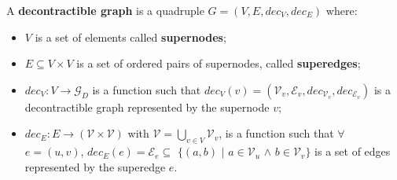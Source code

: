 \begin{minipage}[t]{\textwidth}
    {\tiny
    \begin{definizione}
    A \textbf{decontractible graph} is a quadruple $G = (V, E, dec_V, dec_E)$ where:
    \begin{itemize}
        \item $V$ is a set of elements called \textbf{supernodes};
        \item $E \subseteq V \times V$ is a set of ordered pairs of supernodes, called \textbf{superedges};
        \item $dec_V : V \rightarrow \mathcal{G}_D$ is a function such that $dec_V(v) = (\mathcal{V}_v,
            \mathcal{E}_v, dec_{\mathcal{V}_v}, dec_{\mathcal{E}_v})$ is a decontractible graph represented
            by the supernode $v$;
        \item $dec_E : E \rightarrow (\mathcal{V} \times \mathcal{V})$ with $\mathcal{V} = \bigcup_{v \in V}\mathcal{V}_v$,
            is a function such that $\forall$ $ e = (u, v)$, $dec_E(e) = \mathcal{E}_e \subseteq$ $\{(a, b)$ $\mid$ $a \in \mathcal{V}_u$ $\wedge$
            $b \in \mathcal{V}_v\}$ is a set of edges represented by the superedge $e$.
    \end{itemize}
    \end{definizione}}
\end{minipage}